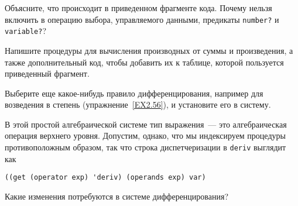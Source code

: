 \begin{exercise}{2.73}
\begin{plainenum}
\item
 Объясните, что происходит в приведенном фрагменте
кода.  Почему нельзя включить в операцию выбора, управляемого данными,
предикаты {\tt number?} и {\tt vari\-able?}?

\item
 Напишите процедуры для вычисления производных от
суммы и произведения, а также дополнительный код,
чтобы добавить их к таблице, которой пользуется приведенный фрагмент.

\item
 Выберите еще какое-нибудь правило
дифференцирования, например для возведения в степень 
(упражнение~\ref{EX2.56}), и установите его в систему.

\item
 В этой простой алгебраической системе тип
выражения~--- это алгебраическая операция верхнего уровня.  Допустим,
однако, что мы индексируем процедуры противоположным образом, так что
строка диспетчеризации в {\tt deriv} выглядит как

\begin{Verbatim}[fontsize=\small]
((get (operator exp) 'deriv) (operands exp) var)
\end{Verbatim}
Какие изменения потребуются в системе дифференцирования?
\end{plainenum}
\end{exercise}
